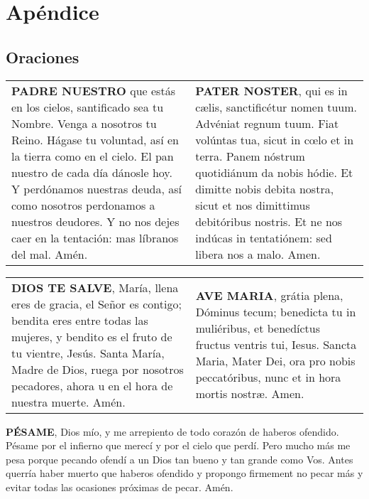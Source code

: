 \documentclass[./rosary.tex]{subfiles}
\begin{document}
\section*{Apéndice}

\subsection*{Oraciones}

\label{sec:ourFather}
\begin{longtable} { p{} p{} }
    \textbf{PADRE NUESTRO} que estás en los cielos, santificado sea tu Nombre. Venga a nosotros tu Reino.
    Hágase tu voluntad, así en la tierra como en el cielo. El pan nuestro de cada día dánosle hoy.
    Y perdónamos nuestras deuda, así como nosotros perdonamos a nuestros deudores.
    Y no nos dejes caer en la tentación: mas líbranos del mal. Amén.

     &

    \textbf{PATER NOSTER}, qui es in cælis, sanctificétur nomen tuum. Advéniat regnum tuum.
    Fiat volúntas tua, sicut in cœlo et in terra. Panem nóstrum quotidiánum da nobis hódie.
    Et dimitte nobis debita nostra, sicut et nos dimittimus debitóribus nostris.
    Et ne nos indúcas in tentatiónem: sed libera nos a malo. Amen.
\end{longtable}

\label{sec:hailMary}
\begin{longtable} { p{} p{} }
    \textbf{DIOS TE SALVE}, María, llena eres de gracia, el Señor es contigo; bendita eres entre todas las mujeres,
    y bendito es el fruto de tu vientre, Jesús. Santa María, Madre de Dios, ruega por nosotros pecadores,
    ahora u en el hora de nuestra muerte. Amén.

     &

    \textbf{AVE MARIA}, grátia plena, Dóminus tecum; benedicta tu in muliéribus, et benedíctus fructus ventris tui,
    Iesus. Sancta Maria, Mater Dei, ora pro nobis peccatóribus, nunc et in hora mortis nostræ. Amen.
\end{longtable}

\label{condolences}
\textbf{PÉSAME}, Dios mío, y me arrepiento de todo corazón de haberos ofendido. Pésame por el infierno que merecí y por el cielo que perdí. Pero mucho
más me pesa porque pecando ofendí a un Dios tan bueno y tan grande como Vos. Antes querría haber muerto que haberos ofendido y propongo firmement no pecar
más y evitar todas las ocasiones próximas de pecar. Amén.
\end{document}
